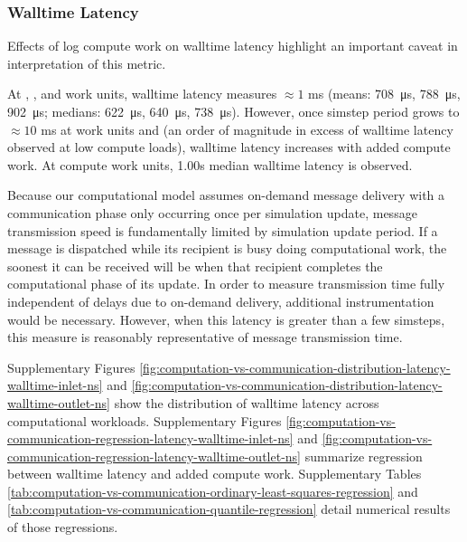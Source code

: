 
\subsubsection{Walltime Latency}

Effects of log compute work on walltime latency highlight an important caveat in interpretation of this metric.

At , , and  work units, walltime latency measures $\approx 1$ ms (means: \SI{708}{\micro\second}, \SI{788}{\micro\second}, \SI{902}{\micro\second}; medians: \SI{622}{\micro\second}, \SI{640}{\micro\second}, \SI{738}{\micro\second}).
However, once simstep period grows to $\approx 10$ ms at  work units and (an order of magnitude in excess of walltime latency observed at low compute loads), walltime latency increases with added compute work.
At  compute work units, 1.00s median walltime latency is observed.

Because our computational model assumes on-demand message delivery with a communication phase only occurring once per simulation update, message transmission speed is fundamentally limited by simulation update period.
If a message is dispatched while its recipient is busy doing computational work, the soonest it can be received will be when that recipient completes the computational phase of its update.
In order to measure transmission time fully independent of delays due to on-demand delivery, additional instrumentation would be necessary.
However, when this latency is greater than a few simsteps, this measure is reasonably representative of message transmission time.

Supplementary Figures \ref{fig:computation-vs-communication-distribution-latency-walltime-inlet-ns} and \ref{fig:computation-vs-communication-distribution-latency-walltime-outlet-ns} show the distribution of walltime latency across computational workloads.
Supplementary Figures \ref{fig:computation-vs-communication-regression-latency-walltime-inlet-ns} and \ref{fig:computation-vs-communication-regression-latency-walltime-outlet-ns} summarize regression between walltime latency and added compute work.
Supplementary Tables \ref{tab:computation-vs-communication-ordinary-least-squares-regression} and \ref{tab:computation-vs-communication-quantile-regression} detail numerical results of those regressions.

